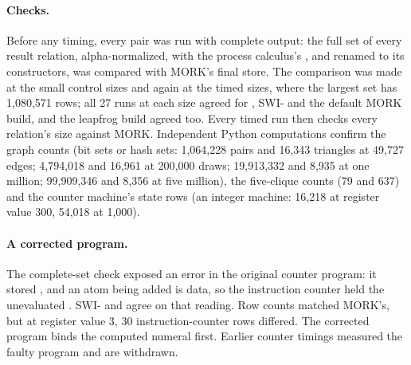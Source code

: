 \paragraph{Checks.}  Before any timing, every pair was run with complete output:
the full set of every result relation, alpha-normalized, with the process
calculus's \code{!},  and \code{|} renamed to its \PeTTa{} constructors,
was compared with MORK's final store.  The comparison was made at the small
control sizes and again at the timed sizes, where the largest set has
1,080,571 rows; all 27 runs at each size agreed for \CeTTa{}, SWI-\PeTTa{} and
the default MORK build, and the leapfrog build agreed too.  Every timed run
then checks every relation's size against MORK.  Independent Python
computations confirm the graph counts (bit sets or hash sets: 1,064,228 pairs
and 16,343 triangles at 49,727 edges; 4,794,018 and 16,961 at 200{,}000 draws;
19,913,332 and 8,935 at one million; 99,909,346 and 8,356 at five million), the
five-clique counts (79 and 637) and the counter machine's state rows (an
integer machine: 16,218 at register value 300, 54,018 at 1,000).

\paragraph{A corrected program.}  The complete-set check exposed an error in
the original \PeTTa{} counter program: it stored
, and an atom being
added is data, so the instruction counter held the unevaluated
.  SWI-\PeTTa{} and \CeTTa{} agree on that reading.  Row
counts matched MORK's, but at register value 3, 30 instruction-counter rows
differed.  The corrected program binds the computed numeral first.  Earlier
counter timings measured the faulty program and are withdrawn.

